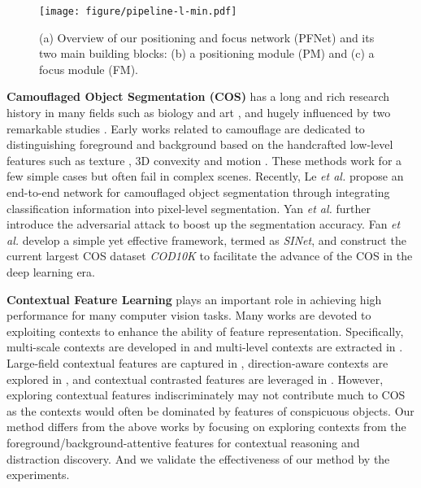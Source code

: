 \documentclass[final]{cvpr}
\begin{document}
\begin{figure*}[tbp]
	\begin{center}
		\texttt{[image: figure/pipeline-l-min.pdf]}
	\end{center}
\caption{(a) Overview of our positioning and focus network (PFNet) and its two main building blocks: (b) a positioning module (PM) and (c) a focus module (FM).}
\label{fig:pipeline}
\end{figure*}

\textbf{Camouflaged Object Segmentation (COS)} has a long and rich research history in many fields such as biology and art \cite{stevens2009animal}, and hugely influenced by two remarkable studies \cite{Thayer1909Concealing,Cott1940}.
Early works related to camouflage are dedicated to distinguishing foreground and background based on the handcrafted low-level features such as texture \cite{4579856}, 3D convexity \cite{pan2011study} and motion \cite{li2011detection}. These methods work for a few simple cases but often fail in complex scenes. Recently, Le \emph{et al.} \cite{le2019anabranch_camo} propose an end-to-end network for camouflaged object segmentation through integrating classification information into pixel-level segmentation. Yan \emph{et al.} \cite{yan2020mirrornet} further introduce the adversarial attack to boost up the segmentation accuracy. Fan \emph{et al.} \cite{Fan_2020_CVPR_sinet} develop a simple yet effective framework, termed as \emph{SINet}, and construct the current largest COS dataset \emph{COD10K} to facilitate the advance of the COS in the deep learning era.

\textbf{Contextual Feature Learning} plays an important role in achieving high performance for many computer vision tasks. Many works are devoted to exploiting contexts to enhance the ability of feature representation. Specifically, multi-scale contexts are developed in \cite{chen2017deeplab,Zhao_2017_CVPR_pspnet,Mei_2021_TCSVT_DCENet} and multi-level contexts are extracted in \cite{yang2019drfn,Zhang_2020_ICME}. Large-field contextual features are captured in \cite{peng2017large,Mei_2020_CVPR_glass}, direction-aware contexts are explored in \cite{Hu_2018_CVPR_dsc}, and contextual contrasted features are leveraged in \cite{Ding_2018_CVPR_contrast,Yang_2019_ICCV_mirror}.
However, exploring contextual features indiscriminately may not contribute much to COS as the contexts would often be dominated by features of conspicuous objects. Our method differs from the above works by focusing on exploring contexts from the foreground/background-attentive features for contextual reasoning and distraction discovery. And we validate the effectiveness of our method by the experiments.
\end{document}
